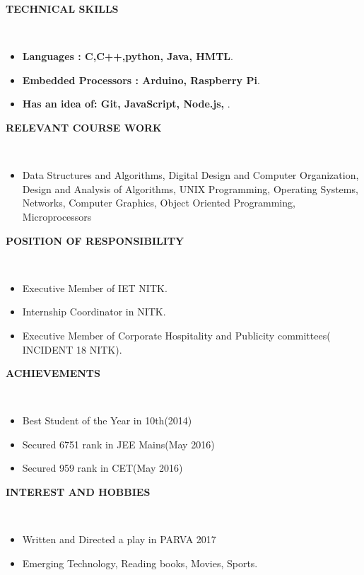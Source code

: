 \documentclass[a4paper,10pt]{article}
\newcommand{\lsep}{-0.5cm}
\newcommand{\resheading}[1]{{\small \colorbox{mygrey}{\begin{minipage}{0.975\textwidth}{\textbf{#1 \vphantom{p\^{E}}}}\end{minipage}}}}
\begin{document}
\resheading{\textbf{TECHNICAL SKILLS} }\\[\lsep]
\begin{itemize}
\item \noindent \textbf{Languages : C,C++,python, Java, HMTL}.
\item \noindent \textbf{Embedded Processors : Arduino, Raspberry Pi}.
\item \noindent \textbf{Has an idea of: Git, JavaScript, Node.js, }.
\end{itemize}

\resheading{\textbf{RELEVANT COURSE WORK} }\\[\lsep]
\begin{itemize}
\item \noindent Data Structures and Algorithms, Digital Design and Computer Organization, Design and Analysis of Algorithms, UNIX Programming, Operating Systems, Networks, Computer Graphics, Object Oriented Programming, Microprocessors
\end{itemize}

\resheading{\textbf{POSITION OF RESPONSIBILITY} }\\[\lsep]
\begin{itemize}
\item \noindent Executive Member of IET NITK.
\item \noindent Internship Coordinator in NITK.
\item \noindent Executive Member of Corporate Hospitality and Publicity committees( INCIDENT 18 NITK).
\newline
\newline
\end{itemize}

\resheading{\textbf{ACHIEVEMENTS} }\\[\lsep]
\begin{itemize}
\item \noindent Best Student of the Year in 10th(2014)
\item \noindent Secured 6751 rank in JEE Mains(May 2016)
\item \noindent Secured 959 rank in CET(May 2016)
\end{itemize}


\resheading{\textbf{INTEREST AND HOBBIES} }\\[\lsep]
\begin{itemize}
\item \noindent Written and Directed a play in PARVA 2017
\item \noindent Emerging Technology, Reading books, Movies, Sports.


\end{itemize}
\end{document}
